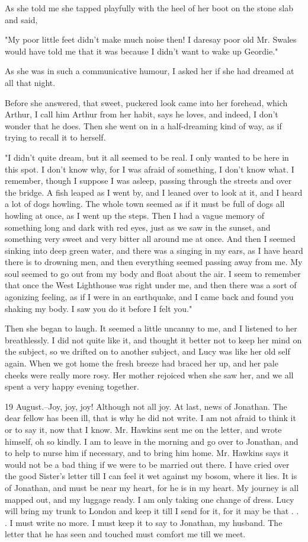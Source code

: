 As she told me she tapped playfully with the heel of her boot on the stone slab and said, 

"My poor little feet didn't make much noise then! I daresay poor old Mr. Swales would have told me that it was because I didn't want to wake up Geordie." 

As she was in such a communicative humour, I asked her if she had dreamed at all that night. 

Before she answered, that sweet, puckered look came into her forehead, which Arthur, I call him Arthur from her habit, says he loves, and indeed, I don't wonder that he does. Then she went on in a half-dreaming kind of way, as if trying to recall it to herself. 

"I didn't quite dream, but it all seemed to be real. I only wanted to be here in this spot. I don't know why, for I was afraid of something, I don't know what. I remember, though I suppose I was asleep, passing through the streets and over the bridge. A fish leaped as I went by, and I leaned over to look at it, and I heard a lot of dogs howling. The whole town seemed as if it must be full of dogs all howling at once, as I went up the steps. Then I had a vague memory of something long and dark with red eyes, just as we saw in the sunset, and something very sweet and very bitter all around me at once. And then I seemed sinking into deep green water, and there was a singing in my ears, as I have heard there is to drowning men, and then everything seemed passing away from me. My soul seemed to go out from my body and float about the air. I seem to remember that once the West Lighthouse was right under me, and then there was a sort of agonizing feeling, as if I were in an earthquake, and I came back and found you shaking my body. I saw you do it before I felt you." 

Then she began to laugh. It seemed a little uncanny to me, and I listened to her breathlessly. I did not quite like it, and thought it better not to keep her mind on the subject, so we drifted on to another subject, and Lucy was like her old self again. When we got home the fresh breeze had braced her up, and her pale cheeks were really more rosy. Her mother rejoiced when she saw her, and we all spent a very happy evening together. 

19 August.--Joy, joy, joy! Although not all joy. At last, news of Jonathan. The dear fellow has been ill, that is why he did not write. I am not afraid to think it or to say it, now that I know. Mr. Hawkins sent me on the letter, and wrote himself, oh so kindly. I am to leave in the morning and go over to Jonathan, and to help to nurse him if necessary, and to bring him home. Mr. Hawkins says it would not be a bad thing if we were to be married out there. I have cried over the good Sister's letter till I can feel it wet against my bosom, where it lies. It is of Jonathan, and must be near my heart, for he is in my heart. My journey is all mapped out, and my luggage ready. I am only taking one change of dress. Lucy will bring my trunk to London and keep it till I send for it, for it may be that . . . I must write no more. I must keep it to say to Jonathan, my husband. The letter that he has seen and touched must comfort me till we meet. 

